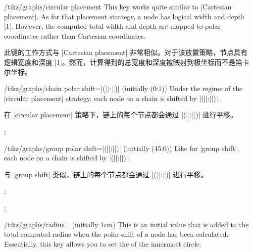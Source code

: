 \begin{key}{/tikz/graphs/circular placement}
    This key works quite similar to |Cartesian placement|. As for that
    placement strategy, a node has logical width and depth |1|. However, the
    computed total width and depth are mapped to polar coordinates rather than
    Cartesian coordinates.

    此键的工作方式与 |Cartesian placement| 非常相似。对于该放置策略，节点具有逻辑宽度和深度 |1|。然而，计算得到的总宽度和深度被映射到极坐标而不是笛卡尔坐标。

    \begin{key}{/tikz/graphs/chain polar shift=|(||:||)| (initially {(0:1)})}
        Under the regime of the |circular placement| strategy, each node on a
        chain is shifted by
        |(||:||)|.

        在 |circular placement| 策略下，链上的每个节点都会通过 |(||:||)| 进行平移。
\begin{codeexample}[preamble={\usetikzlibrary{graphs}}]
\tikz {};
\end{codeexample}
    \end{key}
    \begin{key}{/tikz/graphs/group polar shift=|(||:||)| (initially {(45:0)})}
        Like for |group shift|, each node on a chain is shifted by
        |(||:||)|.

        与 |group shift| 类似，链上的每个节点都会通过 |(||:||)| 进行平移。
\begin{codeexample}[preamble={\usetikzlibrary{graphs}}]
\tikz {};
\end{codeexample}
\begin{codeexample}[preamble={\usetikzlibrary{graphs}}]
\tikz {};
\end{codeexample}
    \end{key}
    \begin{key}{/tikz/graphs/radius= (initially 1cm)}
        This is an initial value that is added to the total computed radius
        when the polar shift of a node has been calculated. Essentially, this
        key allows you to set the  of the innermost circle.
        

\end{key}
\end{key}
